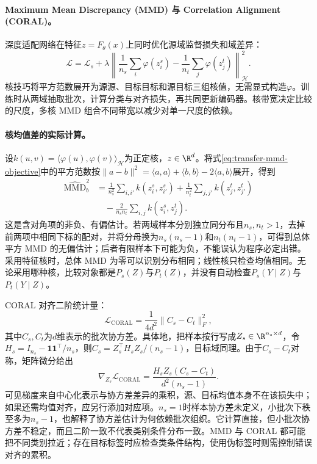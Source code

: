 \paragraph{Maximum Mean Discrepancy (MMD) 与 Correlation Alignment (CORAL)。}
深度适配网络在特征$z=F_\theta(x)$上同时优化源域监督损失和域差异\cite{long2015dan}：
\begin{equation}
 \mathcal L=\mathcal L_s+\lambda\left\|\frac1{n_s}\sum_i\varphi(z_i^s)
 -\frac1{n_t}\sum_j\varphi(z_j^t)\right\|_{\mathcal H}^2.\label{eq:transfer-mmd-objective}
\end{equation}
核技巧将平方范数展开为源源、目标目标和源目标三组核值，无需显式构造$\varphi$。训练时从两域抽取批次，计算分类与对齐损失，再共同更新编码器。核带宽决定比较的尺度，多核 MMD 组合不同带宽以减少对单一尺度的依赖。

\paragraph{核均值差的实际计算。}
设$k(u,v)=\langle\varphi(u),\varphi(v)\rangle_{\mathcal H}$为正定核，$z\in\R^d$。将式\eqref{eq:transfer-mmd-objective}中的平方范数按$\|a-b\|^2=\langle a,a\rangle+\langle b,b\rangle-2\langle a,b\rangle$展开，得到
\begin{align}
 \widehat{\mathrm{MMD}}_b^2
 &=\frac1{n_s^2}\sum_{i,i'}k(z_i^s,z_{i'}^s)
 +\frac1{n_t^2}\sum_{j,j'}k(z_j^t,z_{j'}^t)\\
 &\quad-\frac2{n_sn_t}\sum_{i,j}k(z_i^s,z_j^t).
\end{align}
这是含对角项的非负、有偏估计。若两域样本分别独立同分布且$n_s,n_t>1$，去掉前两项中相同下标的配对，并将分母换为$n_s(n_s-1)$和$n_t(n_t-1)$，可得到总体平方 MMD 的无偏估计；后者有限样本下可能为负，不能误认为程序必定出错。采用特征核时，总体 MMD 为零可以识别分布相同；线性核只检查均值相同。无论采用哪种核，比较对象都是$P_s(Z)$与$P_t(Z)$，并没有自动检查$P_s(Y\mid Z)$与$P_t(Y\mid Z)$。

CORAL 对齐二阶统计量\cite{sun2016coral}：
\begin{equation}
 \mathcal L_{\mathrm{CORAL}}=\frac{1}{4d^2}\|C_s-C_t\|_F^2,
\end{equation}
其中$C_s,C_t$为$d$维表示的批次协方差。具体地，把样本按行写成$Z_s\in\R^{n_s\times d}$，令$H_s=I_{n_s}-\mathbf1\mathbf1^\top/n_s$，则$C_s=Z_s^\top H_sZ_s/(n_s-1)$，目标域同理。由于$C_s-C_t$对称，矩阵微分给出
\begin{equation}
 \nabla_{Z_s}\mathcal L_{\mathrm{CORAL}}
 =\frac{H_sZ_s(C_s-C_t)}{d^2(n_s-1)}.
\end{equation}
可见梯度来自中心化表示与协方差差异的乘积，源、目标均值本身不在该损失中；如果还需均值对齐，应另行添加对应项。$n_s=1$时样本协方差未定义，小批次下秩至多为$n_s-1$，也解释了协方差估计为何依赖批次组织。它计算直接，但小批次协方差不稳定，而且二阶一致不代表类别条件分布一致。MMD 与 CORAL 都可能把不同类别拉近；存在目标标签时应检查类条件结构，使用伪标签时则需控制错误对齐的累积。

